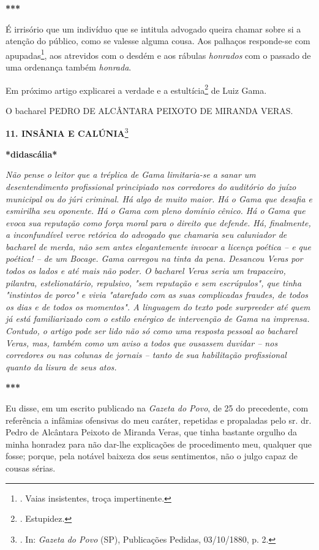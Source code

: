 \textbf{***}

É irrisório que um indivíduo que se intitula advogado queira chamar
sobre si a atenção do público, como se valesse alguma cousa. Aos
palhaços responde-se com apupadas\footnote{. Vaias insistentes, troça
  impertinente.}, aos atrevidos com o desdém e aos rábulas
\emph{honrados} com o passado de uma ordenança também \emph{honrada}.

Em próximo artigo explicarei a verdade e a estultícia\footnote{.
  Estupidez.} de Luiz Gama.

O bacharel PEDRO DE ALCÂNTARA PEIXOTO DE MIRANDA VERAS.

\textbf{11. INSÂNIA E CALÚNIA}\footnote{. In: \emph{Gazeta do Povo}
  (SP), Publicações Pedidas, 03/10/1880, p. 2.}

\textbf{*didascália*}

\emph{Não pense o leitor que a tréplica de Gama limitaria-se a sanar um
desentendimento profissional principiado nos corredores do auditório do
juízo municipal ou do júri criminal. Há algo de muito maior. Há o Gama
que desafia e esmirilha seu oponente. Há o Gama com pleno domínio
cênico. Há o Gama que evoca sua reputação como força moral para o
direito que defende. Há, finalmente, a inconfundível verve retórica do
advogado que chamaria seu caluniador de bacharel de merda, não sem antes
elegantemente invocar a licença poética -- e que poética! -- de um
Bocage. Gama carregou na tinta da pena. Desancou Veras por todos os
lados e até mais não poder. O bacharel Veras seria um trapaceiro,
pilantra, estelionatário, repulsivo, "sem reputação e sem escrúpulos",
que tinha "instintos de porco" e vivia "atarefado com as suas
complicadas fraudes, de todos os dias e de todos os momentos". A
linguagem do texto pode surpreeder até quem já está familiarizado com o
estilo enérgico de intervenção de Gama na imprensa. Contudo, o artigo
pode ser lido não só como uma resposta pessoal ao bacharel Veras, mas,
também como um aviso a todos que ousassem duvidar -- nos corredores ou
nas colunas de jornais -- tanto de sua habilitação profissional quanto
da lisura de seus atos.}

\textbf{***}

Eu disse, em um escrito publicado na \emph{Gazeta do Povo}, de 25 do
precedente, com referência a infâmias ofensivas do meu caráter,
repetidas e propaladas pelo sr. dr. Pedro de Alcântara Peixoto de
Miranda Veras, que tinha bastante orgulho da minha honradez para não
dar-lhe explicações de procedimento meu, qualquer que fosse; porque,
pela notável baixeza dos seus sentimentos, não o julgo capaz de cousas
sérias.

